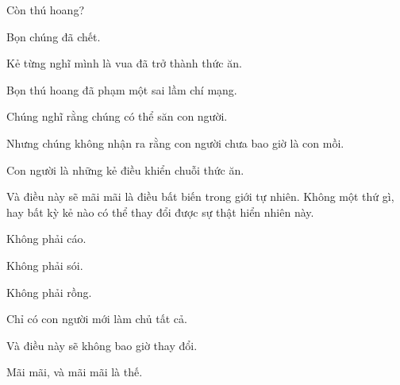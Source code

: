 \documentclass[../main.tex]{subfiles}
\begin{document}
Còn thú hoang?

Bọn chúng đã chết.

Kẻ từng nghĩ mình là vua đã trở thành thức ăn.

Bọn thú hoang đã phạm một sai lầm chí mạng.

Chúng nghĩ rằng chúng có thể săn con người.

Nhưng chúng không nhận ra rằng con người chưa bao giờ là con mồi.

Con người là những kẻ điều khiển chuỗi thức ăn.

Và điều này sẽ mãi mãi là điều bất biến trong giới tự nhiên. Không một thứ gì, hay bất kỳ kẻ nào có thể thay đổi được sự thật hiển nhiên này.

Không phải cáo.

Không phải sói.

Không phải rồng.

Chỉ có con người mới làm chủ tất cả.

Và điều này sẽ không bao giờ thay đổi.

Mãi mãi, và mãi mãi là thế.
\end{document}

